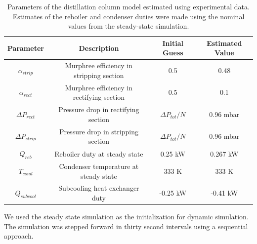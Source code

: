 \begin{table}
    \centering
    \caption{Parameters of the distillation column model estimated using experimental data. Estimates of the reboiler and condenser duties were made using the nominal values from the steady-state simulation.}
    \begin{tabular}{cccc}
        \textbf{Parameter} & \textbf{Description} & \textbf{Initial Guess} & \textbf{Estimated Value}  \\
        \hline
         $\alpha_{strip}$ & Murphree efficiency in stripping section &  0.5 & 0.48 \\ 
         $\alpha_{rect}$ & Murphree efficiency in rectifying section & 0.5 & 0.1 \\
         $\Delta P_{rect}$ & Pressure drop in rectifying section &  $\Delta P_{tot}/N$ & 0.96 mbar \\ 
         $\Delta P_{strip}$ & Pressure drop in stripping section &  $\Delta P_{tot}/N$ & 0.96 mbar \\ 
         $ Q_{reb}$ & Reboiler duty at steady state &  0.25 kW  & 0.267 kW  \\
         $ T_{cond}$ & Condenser temperature at steady state &  333 K  & 333 K\\
         $ Q_{subcool}$ & Subcooling heat exchanger duty & -0.25  kW & -0.41 kW \\
         \hline
    \end{tabular}
    \label{tab:param_estimation}
\end{table}

We used the steady state simulation as the initialization for dynamic simulation. The simulation was stepped forward in thirty second intervals using a sequential approach. 




